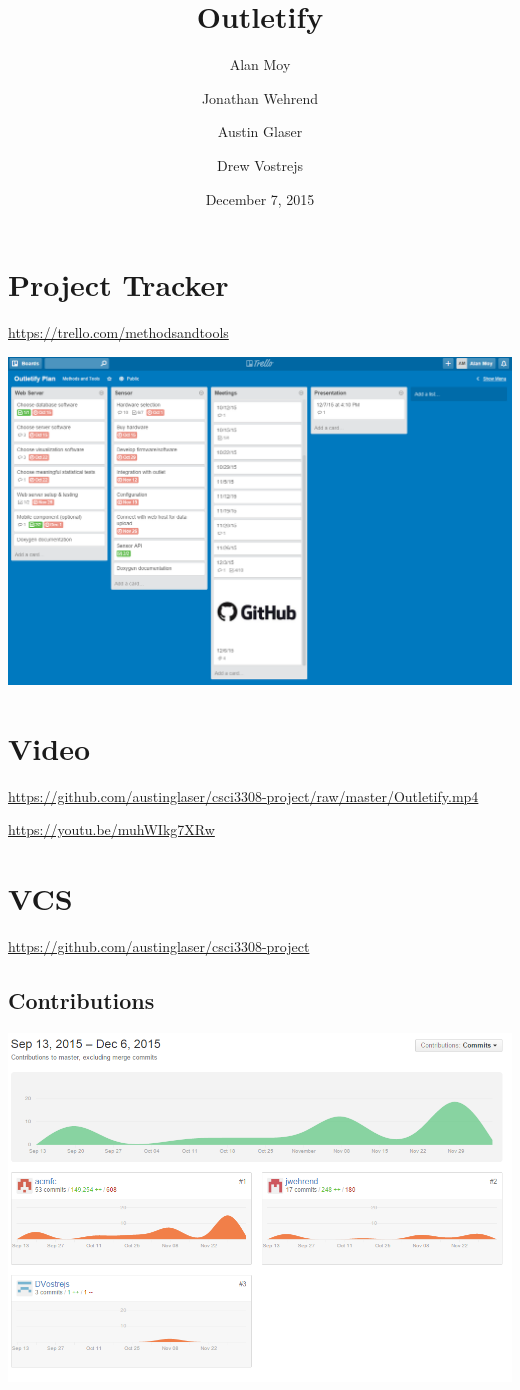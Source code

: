 \documentclass[]{article}
\title{Outletify}
\author{Alan Moy\and Jonathan Wehrend\and Austin Glaser\and Drew Vostrejs}
\date{December 7, 2015}
\begin{document}
\maketitle

\section{Project Tracker}
\url{https://trello.com/methodsandtools}

\includegraphics[width=\textwidth]{trello.png}

\section{Video}
\url{https://github.com/austinglaser/csci3308-project/raw/master/Outletify.mp4}

\url{https://youtu.be/muhWIkg7XRw}

\section{VCS}
\url{https://github.com/austinglaser/csci3308-project}

\subsection{Contributions}
\includegraphics[width=\textwidth]{github_contribution.png}
\end{document}
